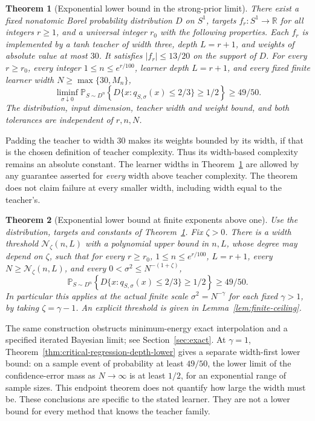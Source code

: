 \documentclass[11pt]{article}
\newtheorem{theorem}{Theorem}[section]\newtheorem{lemma}[theorem]{Lemma}
\theoremstyle{remark}\newtheorem{remark}[theorem]{Remark}
\newcommand{\R}{\mathbb R}\newcommand{\E}{\mathbb E}\newcommand{\Prb}{\mathbb P}
\begin{document}
\begin{theorem}[Exponential lower bound in the strong-prior limit]
\label{thm:strong}
There exist a fixed nonatomic Borel probability distribution $D$ on
$S^1$, targets $f_r:S^1\to\R$ for all integers $r\ge1$, and a universal
integer $r_0$ with the following properties. Each $f_r$ is implemented
by a tanh teacher of width three, depth $L=r+1$, and weights of absolute
value at most $30$. It satisfies $|f_r|\le13/20$ on the support of $D$.
For every $r\ge r_0$, every integer $1\le n\le e^{r/100}$, learner depth
$L=r+1$, and every fixed finite learner width $N\ge\max\{30,M_n\}$,
\begin{equation}\label{eq:strong-result}
 \liminf_{\sigma\downarrow0}\Prb_{S\sim D^n}
 \left\{D\{x:q_{S,\sigma}(x)\le2/3\}\ge1/2\right\}
 \ge49/50.
\end{equation}
The distribution, input dimension, teacher width and weight bound, and
both tolerances are independent of $r,n,N$.
\end{theorem}

Padding the teacher to width $30$ makes its weights bounded by its width,
if that is the chosen definition of teacher complexity. Thus its
width-based complexity remains an absolute constant. The learner widths
in Theorem~\ref{thm:strong} are allowed by any guarantee asserted for
\emph{every} width above teacher complexity. The theorem does not claim
failure at every smaller width, including width equal to the teacher's.

\begin{theorem}[Exponential lower bound at finite exponents above one]
\label{thm:finite}
Use the distribution, targets and constants of
Theorem~\ref{thm:strong}. Fix $\zeta>0$. There is a width threshold
$\mathcal N_\zeta(n,L)$ with a polynomial upper bound in $n,L$, whose
degree may depend on $\zeta$, such that for every $r\ge r_0$,
$1\le n\le e^{r/100}$, $L=r+1$, every
$N\ge\mathcal N_\zeta(n,L)$, and every
$0<\sigma^2\le N^{-(1+\zeta)}$,
\[
 \Prb_{S\sim D^n}
 \left\{D\{x:q_{S,\sigma}(x)\le2/3\}\ge1/2\right\}\ge49/50.
\]
In particular this applies at the actual finite scale
$\sigma^2=N^{-\gamma}$ for each fixed $\gamma>1$, by taking
$\zeta=\gamma-1$. An explicit threshold is given in
Lemma~\ref{lem:finite-ceiling}.
\end{theorem}

The same construction obstructs minimum-energy exact interpolation and
a specified iterated Bayesian limit; see Section~\ref{sec:exact}.
At $\gamma=1$, Theorem~\ref{thm:critical-regression-depth-lower}
gives a separate width-first lower bound: on a sample event of probability
at least $49/50$, the lower limit of the confidence-error mass as
$N\to\infty$ is at least $1/2$, for an exponential range of sample sizes.
This endpoint theorem does not quantify how large the width must be.
These conclusions are specific to the stated learner. They are not a
lower bound for every method that knows the teacher family.
\end{document}
